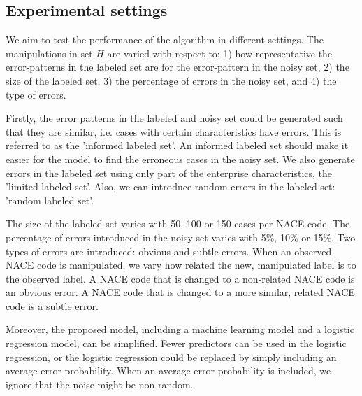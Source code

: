 \documentclass[12pt, a4paper, titlepage]{article}
\begin{document}
					\subsection{Experimental settings}
					\label{section:settings}



We aim to test the performance of the algorithm in different settings. The manipulations in set $H$ are varied with respect to: 1) how representative the error-patterns in the labeled set are for the error-pattern in the noisy set, 2) the size of the labeled set, 3) the percentage of errors in the noisy set, and 4) the type of errors. 

Firstly, the error patterns in the labeled and noisy set could be generated such that they are similar, i.e. cases with certain characteristics have errors. This is referred to as the 'informed labeled set'. An informed labeled set should make it easier for the model to find the erroneous cases in the noisy set. We also generate errors in the labeled set using only part of the enterprise characteristics, the 'limited labeled set'. Also, we can introduce random errors in the labeled set: 'random labeled set'. 

The size of the labeled set varies with 50, 100 or 150 cases per NACE code. The percentage of errors introduced in the noisy set varies with 5\%, 10\% or 15\%. Two types of errors are introduced: obvious and subtle errors. When an observed NACE code is manipulated, we vary how related the new, manipulated label is to the observed label. A NACE code that is changed to a non-related NACE code is an obvious error. A NACE code that is changed to a more similar, related NACE code is a subtle error.

Moreover, the proposed model, including a machine learning model and a logistic regression model, can be simplified. Fewer predictors can be used in the logistic regression, or the logistic regression could be replaced by simply including an average error probability. When an average error probability is included, we ignore that the noise might be non-random.

\end{document}
